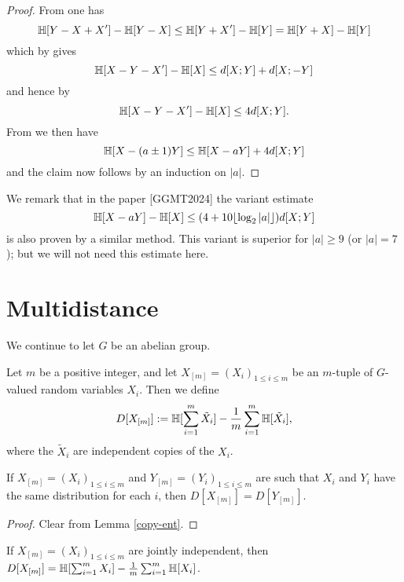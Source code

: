 \begin{proof}\leanok From  one has
  $$\mathbb{H}[Y-X+X'] - \mathbb{H}[Y-X] \leq \mathbb{H}[Y+X'] - \mathbb{H}[Y] = \mathbb{H}[Y+X] - \mathbb{H}[Y]$$
  which by  gives
  $$\mathbb{H}[X-Y-X'] -\mathbb{H}[X] \leq d[X;Y] + d[X;-Y]$$
  and hence by 
  $$\mathbb{H}[X-Y-X'] - \mathbb{H}[X] \leq 4d[X;Y].$$
  From  we then have
  $$\mathbb{H}[X-(a\pm 1)Y] \leq \mathbb{H}[X-aY] + 4 d[X;Y]$$
and the claim now follows by an induction on $|a|$.
\end{proof}

We remark that in the paper [GGMT2024] the variant estimate
$$\mathbb{H}[X-aY] - \mathbb{H}[X] \leq (4 + 10 \lfloor \log_2 |a| \rfloor) d[X;Y]$$
is also proven by a similar method.  This variant is superior for $|a| \geq 9$ (or $|a|=7$); but we will not need this estimate here.



\section{Multidistance}

We continue to let $G$ be an abelian group.

\begin{definition}[Multidistance]\label{multidist-def}\leanok  Let $m$ be a positive integer, and let $X_{[m]} = (X_i)_{1 \leq i \leq m}$ be an $m$-tuple of $G$-valued random variables $X_i$. Then we define
\[
  D[X_{[m]}] := \mathbb{H}[\sum_{i=1}^m \tilde X_i] - \frac{1}{m} \sum_{i=1}^m \mathbb{H}[\tilde X_i],
\]
where the $\tilde X_i$ are independent copies of the $X_i$.
\end{definition}

\begin{lemma}\label{multidist-copy}\leanok  If $X_{[m]} = (X_i)_{1 \leq i \leq m}$ and $Y_{[m]} = (Y_i)_{1 \leq i \leq m}$ are such that $X_i$ and $Y_i$ have the same distribution for each $i$, then $D[X_{[m]}] = D[Y_{[m]}]$.
\end{lemma}

\begin{proof}\leanok Clear from Lemma \ref{copy-ent}.
\end{proof}

\begin{lemma}\label{multidist-indep}\leanok  If $X_{[m]} = (X_i)_{1 \leq i \leq m}$ are jointly independent, then $D[X_{[m]}] = \mathbb{H}[\sum_{i=1}^m X_i] - \frac{1}{m} \sum_{i=1}^m \mathbb{H}[X_i]$.
\end{lemma}

